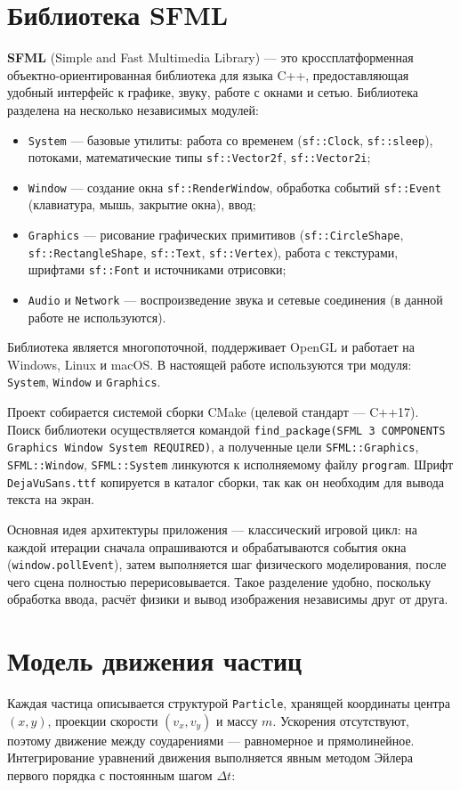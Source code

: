 \documentclass[a4paper]{article}
\newcommand{\subsectiontext}[1]{%
    \section*{\fontsize{13pt}{0pt}\selectfont\textbf{#1}}%
}
\begin{document}
\subsectiontext{Библиотека SFML}

\textbf{SFML} (Simple and Fast Multimedia Library) --- это кроссплатформенная объектно-ориентированная библиотека для языка C++, предоставляющая удобный интерфейс к графике, звуку, работе с окнами и сетью. Библиотека разделена на несколько независимых модулей:

\begin{itemize}
    \item \texttt{System} --- базовые утилиты: работа со временем (\texttt{sf::Clock}, \texttt{sf::sleep}), потоками, математические типы \texttt{sf::Vector2f}, \texttt{sf::Vector2i};
    \item \texttt{Window} --- создание окна \texttt{sf::RenderWindow}, обработка событий \texttt{sf::Event} (клавиатура, мышь, закрытие окна), ввод;
    \item \texttt{Graphics} --- рисование графических примитивов (\texttt{sf::CircleShape}, \texttt{sf::RectangleShape}, \texttt{sf::Text}, \texttt{sf::Vertex}), работа с текстурами, шрифтами \texttt{sf::Font} и источниками отрисовки;
    \item \texttt{Audio} и \texttt{Network} --- воспроизведение звука и сетевые соединения (в данной работе не используются).
\end{itemize}

Библиотека является многопоточной, поддерживает OpenGL и работает на Windows, Linux и macOS. В настоящей работе используются три модуля: \texttt{System}, \texttt{Window} и \texttt{Graphics}.

Проект собирается системой сборки CMake (целевой стандарт --- C++17). Поиск библиотеки осуществляется командой \texttt{find\_package(SFML 3 COMPONENTS Graphics Window System REQUIRED)}, а полученные цели \texttt{SFML::Graphics}, \texttt{SFML::Window}, \texttt{SFML::System} линкуются к исполняемому файлу \texttt{program}. Шрифт \texttt{DejaVuSans.ttf} копируется в каталог сборки, так как он необходим для вывода текста на экран.

Основная идея архитектуры приложения --- классический игровой цикл: на каждой итерации сначала опрашиваются и обрабатываются события окна (\texttt{window.pollEvent}), затем выполняется шаг физического моделирования, после чего сцена полностью перерисовывается. Такое разделение удобно, поскольку обработка ввода, расчёт физики и вывод изображения независимы друг от друга.

\subsectiontext{Модель движения частиц}

Каждая частица описывается структурой \texttt{Particle}, хранящей координаты центра $(x, y)$, проекции скорости $(v_x, v_y)$ и массу $m$. Ускорения отсутствуют, поэтому движение между соударениями --- равномерное и прямолинейное. Интегрирование уравнений движения выполняется явным методом Эйлера первого порядка с постоянным шагом $\Delta t$:
\end{document}
